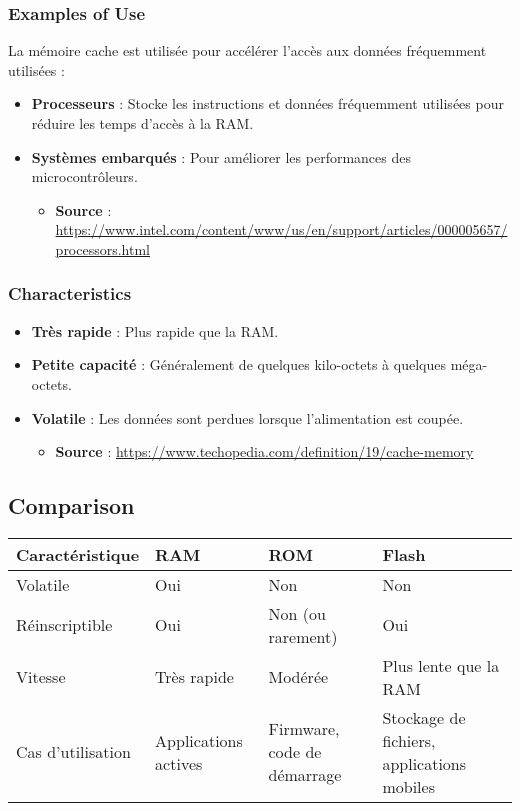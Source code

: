 \documentclass[10pt,a4paper]{article}
\begin{document}
\subsubsection*{Examples of Use}
La mémoire cache est utilisée pour accélérer l'accès aux données fréquemment utilisées :
\begin{itemize}
    \item \textbf{Processeurs} : Stocke les instructions et données fréquemment utilisées pour réduire les temps d'accès à la RAM.
    \item \textbf{Systèmes embarqués} : Pour améliorer les performances des microcontrôleurs.
    \begin{itemize}
        \item \textbf{Source} : \url{https://www.intel.com/content/www/us/en/support/articles/000005657/processors.html}
    \end{itemize}
\end{itemize}

\subsubsection*{Characteristics}
\begin{itemize}
    \item \textbf{Très rapide} : Plus rapide que la RAM.
    \item \textbf{Petite capacité} : Généralement de quelques kilo-octets à quelques méga-octets.
    \item \textbf{Volatile} : Les données sont perdues lorsque l'alimentation est coupée.
    \begin{itemize}
        \item \textbf{Source} : \url{https://www.techopedia.com/definition/19/cache-memory}
    \end{itemize}
\end{itemize}

\subsection*{Comparison}

\begin{center}
\begin{tabular}{|l|l|l|l|}
\hline
\textbf{Caractéristique} & \textbf{RAM} & \textbf{ROM} & \textbf{Flash} \\
\hline
Volatile & Oui & Non & Non \\
\hline
Réinscriptible & Oui & Non (ou rarement) & Oui \\
\hline
Vitesse & Très rapide & Modérée & Plus lente que la RAM \\
\hline
Cas d'utilisation & Applications actives & Firmware, code de démarrage & Stockage de fichiers, applications mobiles \\
\hline
\end{tabular}
\end{center}
\end{document}
